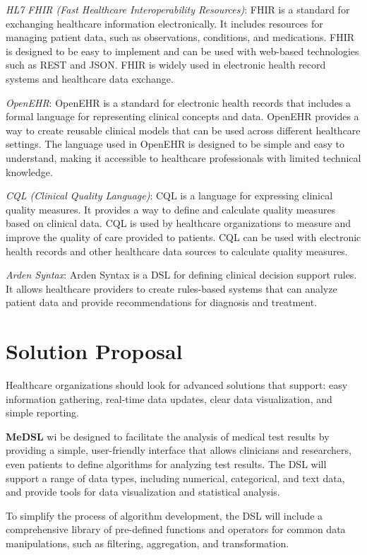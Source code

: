 \emph{HL7 FHIR (Fast Healthcare Interoperability Resources)}: FHIR is a standard for exchanging healthcare information electronically. It includes resources for managing patient data, such as observations, conditions, and medications. FHIR is designed to be easy to implement and can be used with web-based technologies such as REST and JSON. FHIR is widely used in electronic health record systems and healthcare data exchange.

\emph{OpenEHR}: OpenEHR is a standard for electronic health records that includes a formal language for representing clinical concepts and data. OpenEHR provides a way to create reusable clinical models that can be used across different healthcare settings. The language used in OpenEHR is designed to be simple and easy to understand, making it accessible to healthcare professionals with limited technical knowledge.

\emph{CQL (Clinical Quality Language)}: CQL is a language for expressing clinical quality measures. It provides a way to define and calculate quality measures based on clinical data. CQL is used by healthcare organizations to measure and improve the quality of care provided to patients. CQL can be used with electronic health records and other healthcare data sources to calculate quality measures.

\emph{Arden Syntax}: Arden Syntax is a DSL for defining clinical decision support rules. It allows healthcare providers to create rules-based systems that can analyze patient data and provide recommendations for diagnosis and treatment.

\section{Solution Proposal}
Healthcare organizations should look for advanced solutions that support: easy information gathering, real-time data updates, clear data visualization, and simple reporting.

\textbf{MeDSL} wi be designed to facilitate the analysis of medical test results by providing a simple, user-friendly interface that allows clinicians and researchers, even patients to define algorithms for analyzing test results. 
The DSL will support a range of data types, including numerical, categorical, and text data, and provide tools for data visualization and statistical analysis.

To simplify the process of algorithm development, the DSL will include a comprehensive library of pre-defined functions and operators for common data manipulations, such as filtering, aggregation, and transformation.

